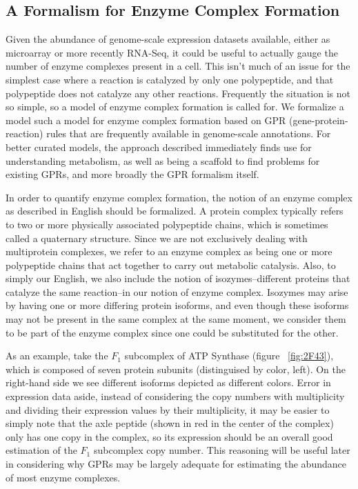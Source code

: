 \documentclass[phd,tocprelim]{cornell}
\theoremstyle{break}
\begin{document}
\subsection{A Formalism for Enzyme Complex Formation}

Given the abundance of genome-scale expression datasets available, either as microarray or more
recently RNA-Seq, it could be useful to actually gauge the number of enzyme complexes present 
in a cell. This isn't much of an issue for the simplest case where a reaction is
catalyzed by only one polypeptide, and that polypeptide does not catalyze any other reactions.
Frequently the situation is not so simple, so a model of enzyme complex formation is called for.
We formalize a model such a model for enzyme complex formation based 
on GPR (gene-protein-reaction) rules that are frequently available
in genome-scale annotations. For better curated models, the approach described immediately finds
use for understanding metabolism, as well as being a scaffold to find problems for
existing GPRs, and more broadly the GPR formalism itself.

In order to  quantify enzyme complex formation, the notion of an enzyme complex as described in English 
should be formalized.
A protein complex typically refers to two or more physically associated polypeptide chains, which is
sometimes called a quaternary structure. Since we
are not exclusively dealing with multiprotein complexes, we refer to an enzyme complex as being
one or more polypeptide chains that act together to carry out metabolic catalysis. Also, to simply
our English, we also include the notion of isozymes--different proteins that catalyze the 
same reaction--in our notion of enzyme complex. Isozymes may arise by having one or more differing
protein isoforms, and even though these isoforms may not be present in the same complex at the same
moment, we consider them to be part of the enzyme complex since one could be substituted for the other.

As an example, take the $F_1$ subcomplex of ATP Synthase (figure
~\ref{fig:2F43}), which is composed of seven protein subunits
(distinguised by color, left). On the right-hand side we see different
isoforms depicted as different colors.  Error in expression data
aside, instead of considering the copy numbers with multiplicity and
dividing their expression values by their multiplicity, it may be
easier to simply note that the axle peptide (shown in red in the
center of the complex) only has one copy in the complex, so its
expression should be an overall good estimation of the $F_1$ subcomplex
copy number. This reasoning will be useful later in considering why
GPRs may be largely adequate for estimating the abundance of most
enzyme complexes.
\end{document}
